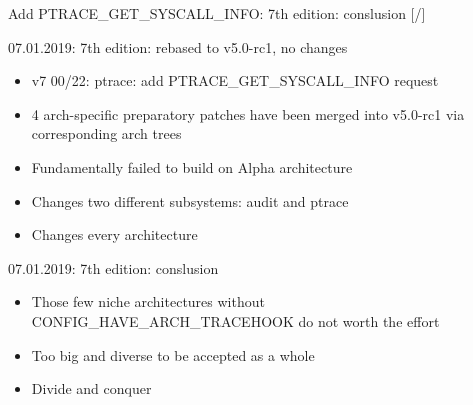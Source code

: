 \documentclass[unicode,aspectratio=169,xcolor={table,dvipsnames,usernames}]{beamer}
\begin{document}
\begin{frame}[fragile]{Add PTRACE\_GET\_SYSCALL\_INFO: 7th edition: conslusion \hfill [\insertframenumber/\inserttotalframenumber]}
\begin{block}{\Large 07.01.2019: 7th edition: rebased to v5.0-rc1, no changes}
\begin{itemize}
	\item v7 00/22: ptrace: add PTRACE\_GET\_SYSCALL\_INFO request
	\item 4 arch-specific preparatory patches have been merged into v5.0-rc1
		via corresponding arch trees
	\item Fundamentally failed to build on Alpha architecture
	\item Changes two different subsystems: audit and ptrace
	\item Changes every architecture
\end{itemize}
\end{block}
\begin{block}{\Large 07.01.2019: 7th edition: conslusion}
\begin{itemize}
	\item Those few niche architectures without CONFIG\_HAVE\_ARCH\_TRACEHOOK do not worth the effort
	\item Too big and diverse to be accepted as a whole
	\item Divide and conquer
\end{itemize}
\end{block}
\end{frame}
\end{document}
